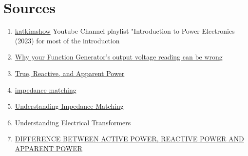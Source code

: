 \section{Sources}
\begin{enumerate}
    \item \href{https://www.youtube.com/watch?v=hRAyfJLZnC0&list=PLmK1EnKxphinxBub5hL0ZoJXWoqjkGE19}{katkimshow} Youtube Channel playlist "Introduction to Power Electronics (2023) for most of the introduction
    \item \href{https://www.youtube.com/watch?v=tClE8s6RZdg}{Why your Function Generator's output voltage reading can be wrong}
    \item \href{https://www.allaboutcircuits.com/textbook/alternating-current/chpt-11/true-reactive-and-apparent-power/}{True, Reactive, and Apparent Power}
    \item \href{https://www.analog.com/en/resources/glossary/impedance-matching.html}{impedance matching}
    \item \href{https://eepower.com/technical-articles/understanding-impedance-matching/#}{Understanding Impedance Matching}
    \item \href{https://eepower.com/power-electronics-textbook/vol-i-electrical-power-systems-design/chapter-5-impedance-matching-and-power-transfer/understanding-electrical-transformers/#}{Understanding Electrical Transformers}
    \item \href{https://eshop.se.com/in/blog/post/difference-between-active-power-reactive-power-and-apparent-power.html#}{DIFFERENCE BETWEEN ACTIVE POWER, REACTIVE POWER AND APPARENT POWER}
\end{enumerate}